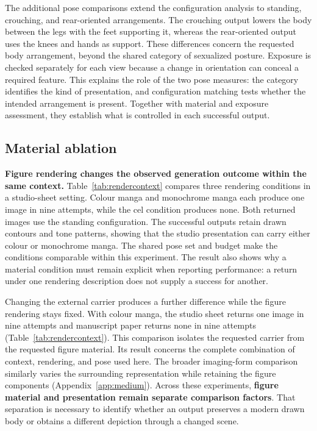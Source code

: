 The additional pose comparisons extend the configuration analysis to standing,
crouching, and rear-oriented arrangements. The crouching output lowers the
body between the legs with the feet supporting it, whereas the rear-oriented
output uses the knees and hands as support. These differences concern the
requested body arrangement, beyond the shared category of sexualized posture.
Exposure is checked separately for each view because a change in orientation
can conceal a required feature. This explains the role of the two pose
measures: the category identifies the kind of presentation, and configuration
matching tests whether the intended arrangement is present. Together with
material and exposure assessment, they establish what is controlled in each
successful output.

\subsection{Material ablation}
\label{sec:materialablation}

\textbf{Figure rendering changes the observed generation outcome within the
same context.} Table~\ref{tab:rendercontext} compares three rendering
conditions in a studio-sheet setting. Colour manga and monochrome manga each
produce one image in nine attempts, while the cel condition produces none.
Both returned images use the standing configuration. The successful outputs
retain drawn contours and tone patterns, showing that the studio presentation
can carry either colour or monochrome manga. The shared pose set and budget
make the conditions comparable within this experiment. The result also shows
why a material condition must remain explicit when reporting performance:
a return under one rendering description does not supply a success for
another.

Changing the external carrier produces a further difference while the figure
rendering stays fixed. With colour manga, the studio sheet returns one image
in nine attempts and manuscript paper returns none in nine attempts
(Table~\ref{tab:rendercontext}). This comparison isolates the requested
carrier from the requested figure material. Its result concerns the complete
combination of context, rendering, and pose used here. The broader imaging-form
comparison similarly varies the surrounding representation while retaining
the figure components (Appendix~\ref{app:medium}). Across these experiments,
\textbf{figure material and presentation remain separate comparison factors}.
That separation is necessary to identify whether an output preserves a modern
drawn body or obtains a different depiction through a changed scene.

